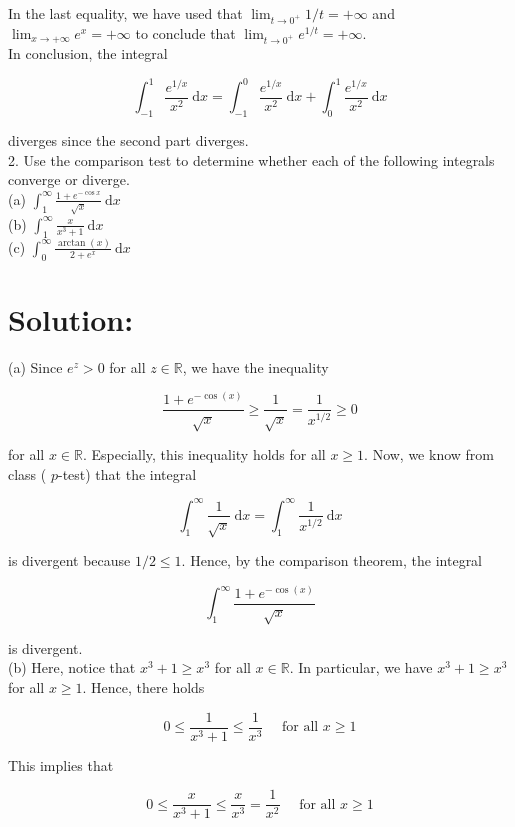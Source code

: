 \documentclass[10pt]{article}
\begin{document}
In the last equality, we have used that $\lim _{t \rightarrow 0^{+}} 1 / t=+\infty$ and $\lim _{x \rightarrow+\infty} e^{x}=+\infty$ to conclude that $\lim _{t \rightarrow 0^{+}} e^{1 / t}=+\infty$.\\
In conclusion, the integral

$$
\int_{-1}^{1} \frac{e^{1 / x}}{x^{2}} \mathrm{~d} x=\int_{-1}^{0} \frac{e^{1 / x}}{x^{2}} \mathrm{~d} x+\int_{0}^{1} \frac{e^{1 / x}}{x^{2}} \mathrm{~d} x
$$

diverges since the second part diverges.\\
2. Use the comparison test to determine whether each of the following integrals converge or diverge.\\
(a) $\int_{1}^{\infty} \frac{1+e^{-\cos x}}{\sqrt{x}} \mathrm{~d} x$\\
(b) $\int_{1}^{\infty} \frac{x}{x^{3}+1} \mathrm{~d} x$\\
(c) $\int_{0}^{\infty} \frac{\arctan (x)}{2+e^{x}} \mathrm{~d} x$

\section*{Solution:}
(a) Since $e^{z}>0$ for all $z \in \mathbb{R}$, we have the inequality

$$
\frac{1+e^{-\cos (x)}}{\sqrt{x}} \geq \frac{1}{\sqrt{x}}=\frac{1}{x^{1 / 2}} \geq 0
$$

for all $x \in \mathbb{R}$. Especially, this inequality holds for all $x \geq 1$. Now, we know from class ( $p$-test) that the integral

$$
\int_{1}^{\infty} \frac{1}{\sqrt{x}} \mathrm{~d} x=\int_{1}^{\infty} \frac{1}{x^{1 / 2}} \mathrm{~d} x
$$

is divergent because $1 / 2 \leq 1$. Hence, by the comparison theorem, the integral

$$
\int_{1}^{\infty} \frac{1+e^{-\cos (x)}}{\sqrt{x}}
$$

is divergent.\\
(b) Here, notice that $x^{3}+1 \geq x^{3}$ for all $x \in \mathbb{R}$. In particular, we have $x^{3}+1 \geq x^{3}$ for all $x \geq 1$. Hence, there holds

$$
0 \leq \frac{1}{x^{3}+1} \leq \frac{1}{x^{3}} \quad \text { for all } x \geq 1
$$

This implies that

$$
0 \leq \frac{x}{x^{3}+1} \leq \frac{x}{x^{3}}=\frac{1}{x^{2}} \quad \text { for all } x \geq 1
$$
\end{document}
